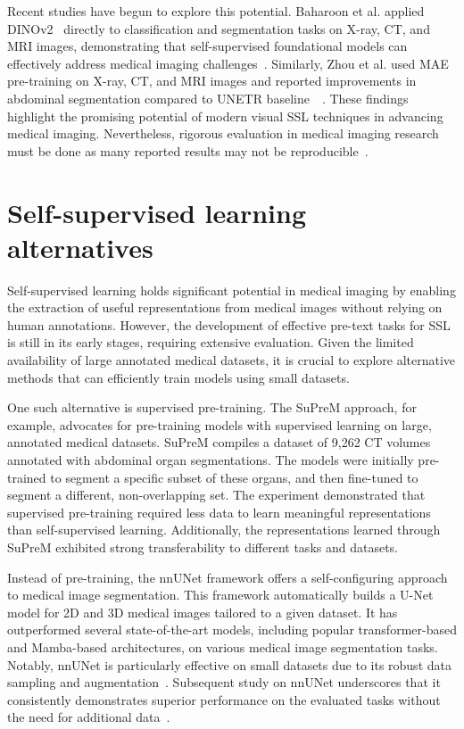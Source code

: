 \documentclass[a4paper,11pt,oneside]{report}
\begin{document}
Recent studies have begun to explore this potential. Baharoon et al. applied DINOv2~\cite{Oquab2024dinov} directly to classification and segmentation tasks on X-ray, CT, and MRI images, demonstrating that self-supervised foundational models can effectively address medical imaging challenges~\cite{Baharoon2023general}. Similarly, Zhou et al. used MAE~\cite{He2022} pre-training on X-ray, CT, and MRI images and reported improvements in abdominal segmentation compared to UNETR baseline~\cite{Hatamizadeh2022}~\cite{Zhou2022}. These findings highlight the promising potential of modern visual SSL techniques in advancing medical imaging. Nevertheless, rigorous evaluation in medical imaging research must be done as many reported results may not be reproducible~\cite{Isensee2024}.

\section{Self-supervised learning alternatives}
Self-supervised learning holds significant potential in medical imaging by enabling the extraction of useful representations from medical images without relying on human annotations. However, the development of effective pre-text tasks for SSL is still in its early stages, requiring extensive evaluation. Given the limited availability of large annotated medical datasets, it is crucial to explore alternative methods that can efficiently train models using small datasets.

One such alternative is supervised pre-training. The SuPreM approach, for example, advocates for pre-training models with supervised learning on large, annotated medical datasets. SuPreM compiles a dataset of 9,262 CT volumes annotated with abdominal organ segmentations. The models were initially pre-trained to segment a specific subset of these organs, and then fine-tuned to segment a different, non-overlapping set. The experiment demonstrated that supervised pre-training required less data to learn meaningful representations than self-supervised learning. Additionally, the representations learned through SuPreM exhibited strong transferability to different tasks and datasets.

Instead of pre-training, the nnUNet framework offers a self-configuring approach to medical image segmentation. This framework automatically builds a U-Net model for 2D and 3D medical images tailored to a given dataset. It has outperformed several state-of-the-art models, including popular transformer-based and Mamba-based architectures, on various medical image segmentation tasks. Notably, nnUNet is particularly effective on small datasets due to its robust data sampling and augmentation~\cite{Isensee2020}. Subsequent study on nnUNet underscores that it consistently demonstrates superior performance on the evaluated tasks without the need for additional data~\cite{Isensee2024}.
\end{document}
